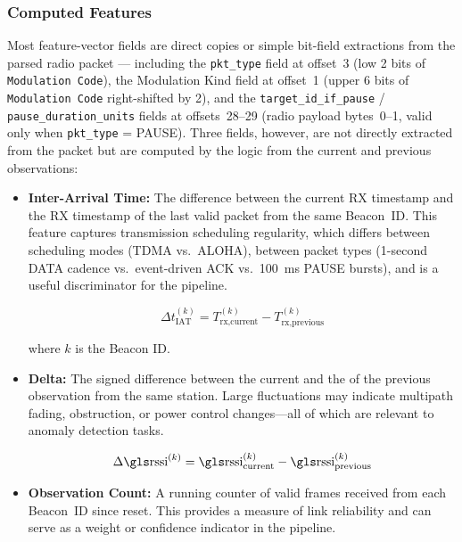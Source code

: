 \documentclass[11pt,letterpaper]{article}
\begin{document}
	\subsubsection{Computed Features}

	Most feature-vector fields are direct copies or simple bit-field extractions from the parsed radio packet --- including the \texttt{pkt\_type} field at offset~3 (low 2 bits of \texttt{Modulation Code}), the Modulation Kind field at offset~1 (upper 6 bits of \texttt{Modulation Code} right-shifted by 2), and the \texttt{target\_id\_if\_pause} / \texttt{pause\_duration\_units} fields at offsets~28--29 (radio payload bytes~0--1, valid only when \texttt{pkt\_type} = PAUSE). Three fields, however, are not directly extracted from the packet but are computed by the \FPGA{} logic from the current and previous observations:

	\begin{itemize}[leftmargin=2em]
		\item \textbf{Inter-Arrival Time:} The difference between the current RX timestamp and the RX timestamp of the last valid packet from the same Beacon~ID. This feature captures transmission scheduling regularity, which differs between scheduling modes (TDMA vs.\ ALOHA), between packet types (1-second DATA cadence vs.\ event-driven ACK vs.\ 100~ms PAUSE bursts), and is a useful discriminator for the \ML{} pipeline.

		\begin{equation}
			\Delta t_{\text{IAT}}^{(k)} = T_{\text{rx,current}}^{(k)} - T_{\text{rx,previous}}^{(k)}
			\label{eq:iat}
		\end{equation}

		where $k$ is the Beacon ID.

		\item \textbf{\RSSI{} Delta:} The signed difference between the current \RSSI{} and the \RSSI{} of the previous observation from the same station. Large \RSSI{} fluctuations may indicate multipath fading, obstruction, or power control changes---all of which are relevant to anomaly detection tasks.

		\begin{equation}
			\Delta \text{\RSSI{}}^{(k)} = \text{\RSSI{}}_{\text{current}}^{(k)} - \text{\RSSI{}}_{\text{previous}}^{(k)}
			\label{eq:rssi_delta}
		\end{equation}

		\item \textbf{Observation Count:} A running counter of valid frames received from each Beacon~ID since reset. This provides a measure of link reliability and can serve as a weight or confidence indicator in the \ML{} pipeline.
	\end{itemize}
\end{document}
